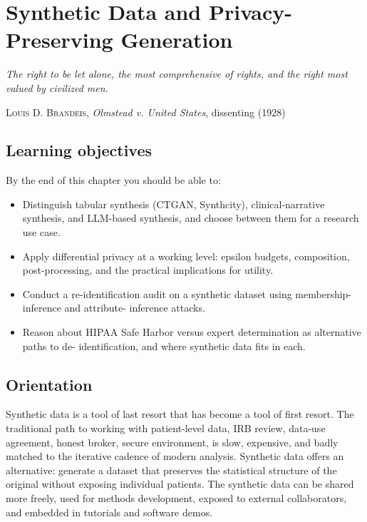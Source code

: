 \documentclass[
  letterpaper,
  11pt]{scrbook}
\providecommand{\tightlist}{%
  \setlength{\itemsep}{0pt}\setlength{\parskip}{0pt}}
\begin{document}
\chapter{Synthetic Data and Privacy-Preserving
Generation}\label{sec-synthetic-data}

\begin{flushright}\small

\emph{The right to be let alone, the most comprehensive of rights, and
the right most valued by civilized men.}

\textsc{Louis D. Brandeis}, \emph{Olmstead v. United States}, dissenting
(1928)

\end{flushright}

\section{Learning objectives}\label{learning-objectives-5}

By the end of this chapter you should be able to:

\begin{itemize}
\tightlist
\item
  Distinguish tabular synthesis (CTGAN, Synthcity), clinical-narrative
  synthesis, and LLM-based synthesis, and choose between them for a
  research use case.
\item
  Apply differential privacy at a working level: epsilon budgets,
  composition, post-processing, and the practical implications for
  utility.
\item
  Conduct a re-identification audit on a synthetic dataset using
  membership-inference and attribute- inference attacks.
\item
  Reason about HIPAA Safe Harbor versus expert determination as
  alternative paths to de- identification, and where synthetic data fits
  in each.
\end{itemize}

\section{Orientation}\label{orientation-5}

Synthetic data is a tool of last resort that has become a tool of first
resort. The traditional path to working with patient-level data, IRB
review, data-use agreement, honest broker, secure environment, is slow,
expensive, and badly matched to the iterative cadence of modern
analysis. Synthetic data offers an alternative: generate a dataset that
preserves the statistical structure of the original without exposing
individual patients. The synthetic data can be shared more freely, used
for methods development, exposed to external collaborators, and embedded
in tutorials and software demos.
\end{document}
